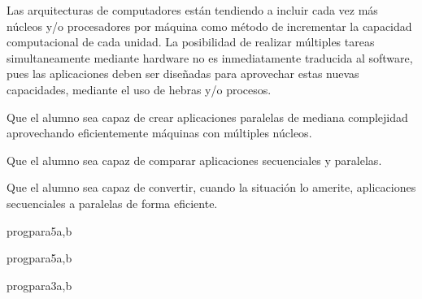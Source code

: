 \begin{syllabus}


\begin{justification}
Las arquitecturas de computadores están tendiendo a incluir cada vez más núcleos 
y/o procesadores por máquina como método de incrementar la capacidad computacional
de cada unidad. La posibilidad de realizar múltiples tareas simultaneamente mediante hardware 
no es inmediatamente traducida al software, pues las aplicaciones deben 
ser diseñadas para aprovechar estas nuevas capacidades, mediante el uso de hebras y/o procesos.
\end{justification}

\begin{goals}
\item Que el alumno sea capaz de crear aplicaciones paralelas de mediana complejidad aprovechando eficientemente máquinas con múltiples núcleos.
\item Que el alumno sea capaz de comparar aplicaciones secuenciales y paralelas.
\item Que el alumno sea capaz de convertir, cuando la situación lo amerite, aplicaciones secuenciales a paralelas de forma eficiente.
\end{goals}

\begin{outcomes}
\end{outcomes}

\begin{unit}{\CNParallelComputationDef}{progpara}{5}{a,b}
      \CNParallelComputationAllTopics %
      \CNParallelComputationAllObjectives
\end{unit}

\begin{unit}{\ARMultiprocessingDef}{progpara}{5}{a,b}
      \ARMultiprocessingAllTopics
      \ARMultiprocessingAllObjectives
\end{unit}

\begin{unit}{\ALParallelAlgorithmsDef}{progpara}{3}{a,b}
      \ALParallelAlgorithmsAllTopics %
      \ALParallelAlgorithmsAllObjectives
\end{unit}


\end{syllabus}
